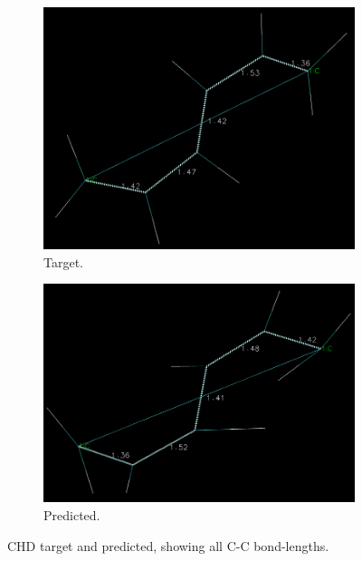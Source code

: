 \documentclass[]{article}
\begin{document}
	\begin{figure}[H]
	\centering

		\begin{subfigure}{0.6\textwidth}
			\includegraphics[width=\textwidth]{target_step48.png}
			\caption{Target.}
			\label{fig:chd_target}
		\end{subfigure}
	\hfill
		\begin{subfigure}{0.6\textwidth}
			\includegraphics[width=\textwidth]{1003.png}
			\caption{Predicted.}
			\label{fig:chd_predicted}
		\end{subfigure}
	\caption{CHD target and predicted, showing all C-C bond-lengths.}
	\label{fig:figures}
	\end{figure}
\end{document}
